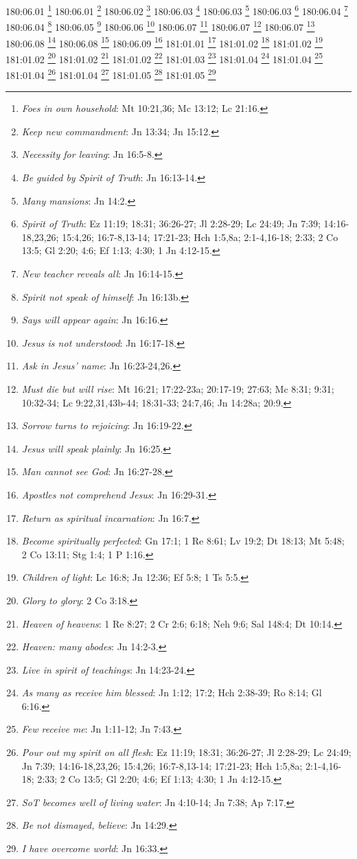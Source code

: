180:06.01 \footnote{\textit{Foes in own household}: Mt 10:21,36; Mc 13:12; Lc 21:16.}
180:06.01 \footnote{\textit{Keep new commandment}: Jn 13:34; Jn 15:12.}
180:06.02 \footnote{\textit{Necessity for leaving}: Jn 16:5-8.}
180:06.03 \footnote{\textit{Be guided by Spirit of Truth}: Jn 16:13-14.}
180:06.03 \footnote{\textit{Many mansions}: Jn 14:2.}
180:06.03 \footnote{\textit{Spirit of Truth}: Ez 11:19; 18:31; 36:26-27; Jl 2:28-29; Lc 24:49; Jn 7:39; 14:16-18,23,26; 15:4,26; 16:7-8,13-14; 17:21-23; Hch 1:5,8a; 2:1-4,16-18; 2:33; 2 Co 13:5; Gl 2:20; 4:6; Ef 1:13; 4:30; 1 Jn 4:12-15.}
180:06.04 \footnote{\textit{New teacher reveals all}: Jn 16:14-15.}
180:06.04 \footnote{\textit{Spirit not speak of himself}: Jn 16:13b.}
180:06.05 \footnote{\textit{Says will appear again}: Jn 16:16.}
180:06.06 \footnote{\textit{Jesus is not understood}: Jn 16:17-18.}
180:06.07 \footnote{\textit{Ask in Jesus' name}: Jn 16:23-24,26.}
180:06.07 \footnote{\textit{Must die but will rise}: Mt 16:21; 17:22-23a; 20:17-19; 27:63; Mc 8:31; 9:31; 10:32-34; Lc 9:22,31,43b-44; 18:31-33; 24:7,46; Jn 14:28a; 20:9.}
180:06.07 \footnote{\textit{Sorrow turns to rejoicing}: Jn 16:19-22.}
180:06.08 \footnote{\textit{Jesus will speak plainly}: Jn 16:25.}
180:06.08 \footnote{\textit{Man cannot see God}: Jn 16:27-28.}
180:06.09 \footnote{\textit{Apostles not comprehend Jesus}: Jn 16:29-31.}
181:01.01 \footnote{\textit{Return as spiritual incarnation}: Jn 16:7.}
181:01.02 \footnote{\textit{Become spiritually perfected}: Gn 17:1; 1 Re 8:61; Lv 19:2; Dt 18:13; Mt 5:48; 2 Co 13:11; Stg 1:4; 1 P 1:16.}
181:01.02 \footnote{\textit{Children of light}: Lc 16:8; Jn 12:36; Ef 5:8; 1 Ts 5:5.}
181:01.02 \footnote{\textit{Glory to glory}: 2 Co 3:18.}
181:01.02 \footnote{\textit{Heaven of heavens}: 1 Re 8:27; 2 Cr 2:6; 6:18; Neh 9:6; Sal 148:4; Dt 10:14.}
181:01.02 \footnote{\textit{Heaven: many abodes}: Jn 14:2-3.}
181:01.03 \footnote{\textit{Live in spirit of teachings}: Jn 14:23-24.}
181:01.04 \footnote{\textit{As many as receive him blessed}: Jn 1:12; 17:2; Hch 2:38-39; Ro 8:14; Gl 6:16.}
181:01.04 \footnote{\textit{Few receive me}: Jn 1:11-12; Jn 7:43.}
181:01.04 \footnote{\textit{Pour out my spirit on all flesh}: Ez 11:19; 18:31; 36:26-27; Jl 2:28-29; Lc 24:49; Jn 7:39; 14:16-18,23,26; 15:4,26; 16:7-8,13-14; 17:21-23; Hch 1:5,8a; 2:1-4,16-18; 2:33; 2 Co 13:5; Gl 2:20; 4:6; Ef 1:13; 4:30; 1 Jn 4:12-15.}
181:01.04 \footnote{\textit{SoT becomes well of living water}: Jn 4:10-14; Jn 7:38; Ap 7:17.}
181:01.05 \footnote{\textit{Be not dismayed, believe}: Jn 14:29.}
181:01.05 \footnote{\textit{I have overcome world}: Jn 16:33.}
